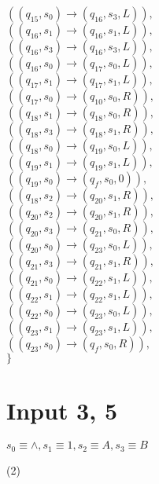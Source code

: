 \documentclass{article} %
\begin{document}
\begin{center}
\begin{varwidth}{\textwidth}
\begin{tasks}[label={},label-width={1cm}]
                \task
                $((q_{15}, s_{0}) \to ( q_{16}, s_{3}, L)),$\\
                $((q_{16}, s_{1}) \to ( q_{16}, s_{1}, L)),$\\
                $((q_{16}, s_{3}) \to ( q_{16}, s_{3}, L)),$\\
                $((q_{16}, s_{0}) \to ( q_{17}, s_{0}, L)),$\\
                $((q_{17}, s_{1}) \to ( q_{17}, s_{1}, L)),$\\
                $((q_{17}, s_{0}) \to ( q_{10}, s_{0}, R)),$\\
                $((q_{18}, s_{1}) \to ( q_{18}, s_{0}, R)),$\\
                $((q_{18}, s_{3}) \to ( q_{18}, s_{1}, R)),$\\
                $((q_{18}, s_{0}) \to ( q_{19}, s_{0}, L)),$\\
                $((q_{19}, s_{1}) \to ( q_{19}, s_{1}, L)),$\\
                $((q_{19}, s_{0}) \to ( q_{f}, s_{0}, 0)),$\\
                $((q_{18}, s_{2}) \to ( q_{20}, s_{1}, R)),$\\
                $((q_{20}, s_{2}) \to ( q_{20}, s_{1}, R)),$\\
                $((q_{20}, s_{3}) \to ( q_{21}, s_{0}, R)),$\\
                $((q_{20}, s_{0}) \to ( q_{23}, s_{0}, L)),$\\
                $((q_{21}, s_{3}) \to ( q_{21}, s_{1}, R)),$\\
                $((q_{21}, s_{0}) \to ( q_{22}, s_{1}, L)),$\\
                $((q_{22}, s_{1}) \to ( q_{22}, s_{1}, L)),$\\
                $((q_{22}, s_{0}) \to ( q_{23}, s_{0}, L)),$\\
                $((q_{23}, s_{1}) \to ( q_{23}, s_{1}, L)),$\\
                $((q_{23}, s_{0}) \to ( q_{f}, s_{0}, R)),$\\
                $\}$
            \end{tasks}
            \end{varwidth}
        \end{center}
    \section{Input 3, 5}
    $s_0 \equiv \land, s_1 \equiv 1, s_2 \equiv A, s_3 \equiv B$\\
        \begin{center}
            \begin{varwidth}{\textwidth}
            \begin{tasks}[label={(\roman*)},label-width={1cm}] (2)
                \task

                \task

            \end{tasks}
            \end{varwidth}
        \end{center}
\end{document}
